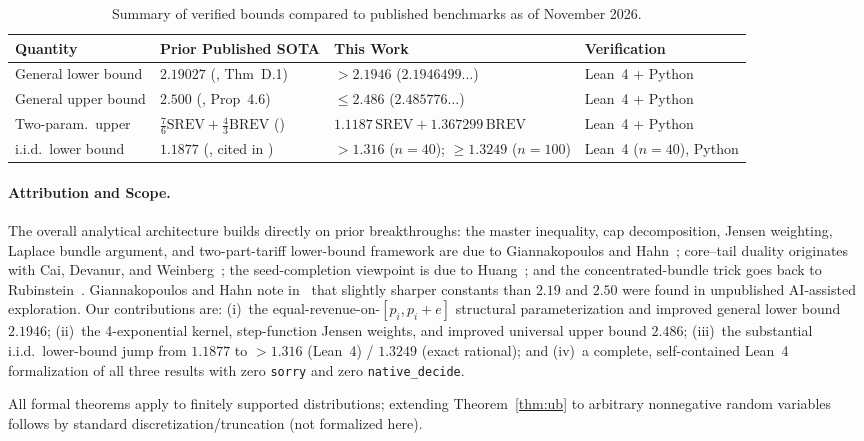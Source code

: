 \documentclass[11pt]{article}
\newcommand{\SREV}{\mathrm{SREV}}
\newcommand{\BREV}{\mathrm{BREV}}
\begin{document}
\begin{table}[t]
\centering
\footnotesize
\setlength{\tabcolsep}{4.5pt}
\begin{tabular}{@{}llll@{}}
\toprule
Quantity & Prior Published SOTA & This Work & Verification \\
\midrule
General lower bound & $2.19027$ (\cite{gh2026}, Thm~D.1) & $> 2.1946$ ($2.1946499\ldots$) & Lean~4 + Python \\
General upper bound & $2.500$ (\cite{gh2026}, Prop~4.6) & $\le 2.486$ ($2.485776\ldots$) & Lean~4 + Python \\
Two-param.\ upper & $\frac{7}{6}\SREV + \frac{4}{3}\BREV$ (\cite{gh2026}) & $1.1187\,\SREV + 1.367299\,\BREV$ & Lean~4 + Python \\
i.i.d.\ lower bound & $1.1877$ (\cite{masimchilevi2021}, cited in \cite{gh2026}) & $> 1.316$ ($n=40$); $\ge 1.3249$ ($n=100$) & Lean~4 ($n=40$), Python \\
\bottomrule
\end{tabular}
\caption{Summary of verified bounds compared to published benchmarks as of November 2026.}
\label{tab:summary}
\end{table}

\paragraph{Attribution and Scope.}
The overall analytical architecture builds directly on prior breakthroughs: the master inequality, cap decomposition, Jensen weighting, Laplace bundle argument, and two-part-tariff lower-bound framework are due to Giannakopoulos and Hahn~\cite{gh2026}; core--tail duality originates with Cai, Devanur, and Weinberg~\cite{cdw2016}; the seed-completion viewpoint is due to Huang~\cite{huang2026}; and the concentrated-bundle trick goes back to Rubinstein~\cite{rubinstein2016}. Giannakopoulos and Hahn note in~\cite{gh2026} that slightly sharper constants than $2.19$ and $2.50$ were found in unpublished AI-assisted exploration. Our contributions are: (i)~the equal-revenue-on-$[p_i, p_i+e]$ structural parameterization and improved general lower bound $2.1946$; (ii)~the 4-exponential kernel, step-function Jensen weights, and improved universal upper bound $2.486$; (iii)~the substantial i.i.d.\ lower-bound jump from $1.1877$ to $> 1.316$ (Lean~4) / $1.3249$ (exact rational); and (iv)~a complete, self-contained Lean~4 formalization of all three results with zero \texttt{sorry} and zero \texttt{native\_decide}.

All formal theorems apply to finitely supported distributions; extending Theorem~\ref{thm:ub} to arbitrary nonnegative random variables follows by standard discretization/truncation (not formalized here).
\end{document}
